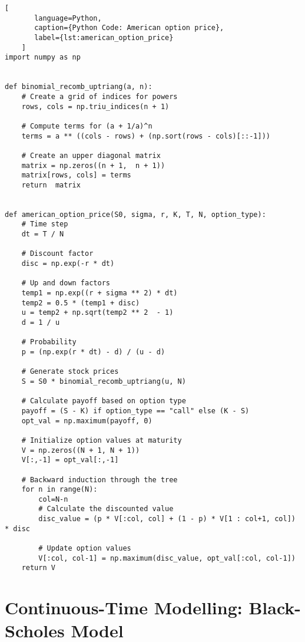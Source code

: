    \begin{lstlisting}[
       language=Python,
       caption={Python Code: American option price},
       label={lst:american_option_price}
    ]
import numpy as np


def binomial_recomb_uptriang(a, n):
    # Create a grid of indices for powers
    rows, cols = np.triu_indices(n + 1)

    # Compute terms for (a + 1/a)^n
    terms = a ** ((cols - rows) + (np.sort(rows - cols)[::-1]))

    # Create an upper diagonal matrix
    matrix = np.zeros((n + 1,  n + 1))
    matrix[rows, cols] = terms
    return  matrix


def american_option_price(S0, sigma, r, K, T, N, option_type):
    # Time step
    dt = T / N

    # Discount factor
    disc = np.exp(-r * dt)

    # Up and down factors
    temp1 = np.exp((r + sigma ** 2) * dt)
    temp2 = 0.5 * (temp1 + disc)
    u = temp2 + np.sqrt(temp2 ** 2  - 1)
    d = 1 / u

    # Probability
    p = (np.exp(r * dt) - d) / (u - d)

    # Generate stock prices
    S = S0 * binomial_recomb_uptriang(u, N)

    # Calculate payoff based on option type
    payoff = (S - K) if option_type == "call" else (K - S)
    opt_val = np.maximum(payoff, 0)

    # Initialize option values at maturity
    V = np.zeros((N + 1, N + 1))
    V[:,-1] = opt_val[:,-1]

    # Backward induction through the tree
    for n in range(N):
        col=N-n
        # Calculate the discounted value
        disc_value = (p * V[:col, col] + (1 - p) * V[1 : col+1, col]) * disc

        # Update option values
        V[:col, col-1] = np.maximum(disc_value, opt_val[:col, col-1])
    return V
   \end{lstlisting}


\section{Continuous-Time Modelling: Black-Scholes Model}
    \label{sec:cont_time}


